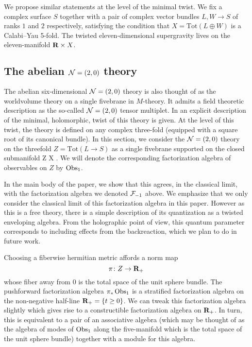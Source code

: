 We propose similar statements at the level of the minimal twist. 
We fix a complex surface $S$ together with a pair of complex vector bundles $L,W \to S$ of ranks $1$ and $2$ respectively, satisfying the condition that $X = \text{Tot} (L \oplus W)$ is a Calabi--Yau 5-fold.
The twisted eleven-dimensional supergravity lives on the eleven-manifold $\mathbf{R} \times X$. 

\subsection*{The abelian $\mathcal N=(2,0)$ theory}

The abelian six-dimensional $\mathcal N=(2,0)$ theory is also thought of as the worldvolume theory on a single fivebrane in $M$-theory. 
It admits a field theoretic description as the so-called $\mathcal N=(2,0)$ tensor multiplet. 
In \cite{SWtensor} an explicit description of the minimal, holomorphic, twist of this theory is given.
At the level of this twist, the theory is defined on any complex three-fold (equipped with a square root of its canonical bundle). 
In this section, we consider the $\mathcal N=(2,0)$ theory on the threefold $Z = \text{Tot}(L \to S)$ as a single fivebrane supported on the closed submanifold
\beqn
Z \hookrightarrow \R \times X .
\eeqn
We will denote the corresponding factorization algebra of observables on $Z$ by $\operatorname{Obs}_1$.

In the main body of the paper, we show that this agrees, in the classical limit, with the factorization algebra we denoted $\mathcal F_{-1}$ above. 
We emphasize that we only consider the classical limit of this factorization algebra in this paper. 
However as this is a free theory, there is a simple description of its quantization as a twisted enveloping algebra.
From the holographic point of view, this quantum parameter corresponds to including effects from the backreaction, which we plan to do in future work.

Choosing a fiberwise hermitian metric affords a norm map 
\[
\pi \colon Z \to \mathbf{R}_{+}
\] 
whose fiber away from $0$ is the total space of the unit sphere bundle.
The pushforward factorization algebra $\pi_{*}\operatorname{Obs}_{1}$ is a stratified factorization algebra on the non-negative half-line $\mathbf{R}_+ = \{t \geq 0\}$. 
We can tweak this factorization algebra slightly which gives rise to a constructible factorization algebra on $\mathbf{R}_+$.
In turn, this is equivalent to a pair of an associative algebra (which may be thought of as the algebra of modes of $\operatorname{Obs}_{1}$ along the five-manifold which is the total space of the unit sphere bundle) together with a module for this algebra.

